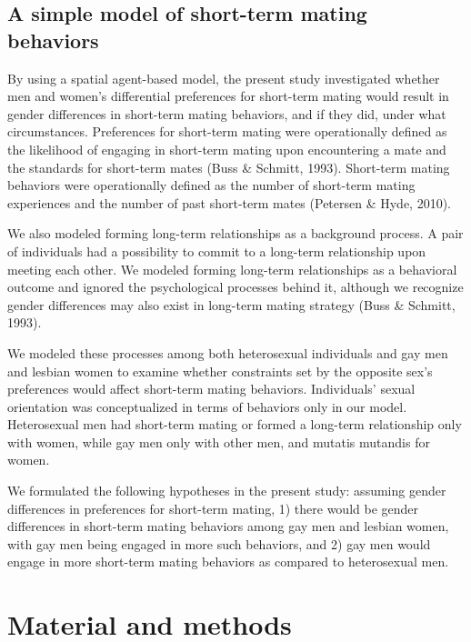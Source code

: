 \documentclass[
  11pt,
]{article}
\begin{document}
\hypertarget{a-simple-model-of-short-term-mating-behaviors}{%
\subsection{A simple model of short-term mating
behaviors}\label{a-simple-model-of-short-term-mating-behaviors}}

By using a spatial agent-based model, the present study investigated
whether men and women's differential preferences for short-term mating
would result in gender differences in short-term mating behaviors, and
if they did, under what circumstances. Preferences for short-term mating
were operationally defined as the likelihood of engaging in short-term
mating upon encountering a mate and the standards for short-term mates
(Buss \& Schmitt, 1993). Short-term mating behaviors were operationally
defined as the number of short-term mating experiences and the number of
past short-term mates (Petersen \& Hyde, 2010).

We also modeled forming long-term relationships as a background process.
A pair of individuals had a possibility to commit to a long-term
relationship upon meeting each other. We modeled forming long-term
relationships as a behavioral outcome and ignored the psychological
processes behind it, although we recognize gender differences may also
exist in long-term mating strategy (Buss \& Schmitt, 1993).

We modeled these processes among both heterosexual individuals and gay
men and lesbian women to examine whether constraints set by the opposite
sex's preferences would affect short-term mating behaviors. Individuals'
sexual orientation was conceptualized in terms of behaviors only in our
model. Heterosexual men had short-term mating or formed a long-term
relationship only with women, while gay men only with other men, and
mutatis mutandis for women.

We formulated the following hypotheses in the present study: assuming
gender differences in preferences for short-term mating, 1) there would
be gender differences in short-term mating behaviors among gay men and
lesbian women, with gay men being engaged in more such behaviors, and 2)
gay men would engage in more short-term mating behaviors as compared to
heterosexual men.

\hypertarget{material-and-methods}{%
\section{Material and methods}\label{material-and-methods}}
\end{document}
